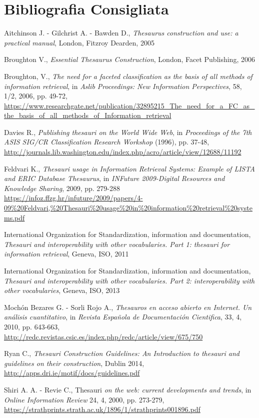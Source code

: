 \section*{Bibliografia Consigliata}
{\parindent0pt 
Aitchinson J. - Gilchrist A. - Bawden D., \emph{Thesaurus construction
and use: a practical manual}, London, Fitzroy Dearden, 2005

Broughton V., \emph{Essential Thesaurus Construction}, London, Facet
Publishing, 2006

Broughton, V., \emph{The need for a faceted classification as the basis
of all methods of information retrieval}, in \emph{Aslib Proceedings:
New Information Perspectives}, 58, 1/2, 2006, pp. 49-72,
\url{https://www.researchgate.net/publication/32895215_The_need_for_a_FC_as_the_basis_of_all_methods_of_Information_retrieval}

Davies R., \emph{Publishing thesauri on the World Wide Web}, in
\emph{Proceedings of the 7th ASIS SIG/CR Classification Research
Workshop} (1996), pp. 37-48,
\url{http://journals.lib.washington.edu/index.php/acro/article/view/12688/11192}

Feldvari K., \emph{Thesauri usage in Information Retrieval Systems:
Example of LISTA and ERIC Database Thesaurus}, in \emph{INFuture
2009-Digital Resources and Knowledge Sharing}, 2009, pp. 279-288
\url{https://infoz.ffzg.hr/infuture/2009/papers/4-09\%20Feldvari,\%20Thesauri\%20usage\%20in\%20information\%20retrieval\%20systems.pdf}

International Organization for Standardization, information and
documentation, \emph{Thesauri and interoperability with other
vocabularies. Part 1: thesauri for information retrieval}, Geneva, ISO,
2011

International Organization for Standardization, information and
documentation, \emph{Thesauri and interoperability with other
vocabularies. Part 2: interoperability with other vocabularies}, Geneva,
ISO, 2013

Mochón Bezares G. - Sorli Rojo A., \emph{Thesauros en acceso abierto en
Internet. Un análisis cuantitativo}, in \emph{Revista Española de
Documentación Cientifica}, 33, 4, 2010, pp. 643-663,
\url{http://redc.revistas.csic.es/index.php/redc/article/view/675/750}

Ryan C., \emph{Thesauri Construction Guidelines: An Introduction to
thesauri and guidelines on their construction}, Dublin 2014,
\url{http://apps.dri.ie/motif/docs/guidelines.pdf}

Shiri A. A. - Revie C., Thesauri \emph{on the web: current developments
and trends}, in \emph{Online Information Review} 24, 4, 2000, pp.
273-279,
\url{https://strathprints.strath.ac.uk/1896/1/strathprints001896.pdf}

}

